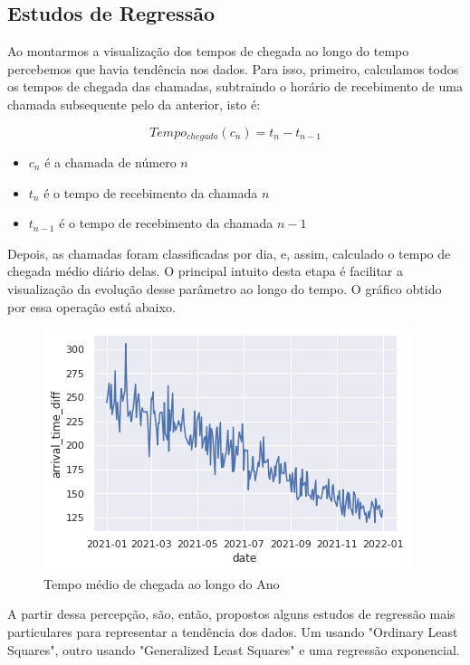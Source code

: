 \subsection{Estudos de Regressão}

Ao montarmos a visualização dos tempos de chegada ao longo do tempo percebemos que havia tendência nos dados. Para isso, primeiro, calculamos todos os tempos de chegada das chamadas, subtraindo o horário de recebimento de uma chamada subsequente pelo da anterior, isto é:

$$Tempo_{chegada}(c_n) = t_n - t_{n-1}$$ 

\begin{itemize}
    \item $c_n$ é a chamada de número $n$
    \item $t_n$ é o tempo de recebimento da chamada $n$
    \item $t_{n-1}$ é o tempo de recebimento da chamada $n-1$
\end{itemize}

Depois, as chamadas foram classificadas por dia, e, assim, calculado o tempo de chegada médio diário delas. O principal intuito desta etapa é facilitar a visualização da evolução desse parâmetro ao longo do tempo. O gráfico obtido por essa operação está abaixo.

\begin{figure}[H]
    \includegraphics{analise-de-dados/regressao/tempo_chegada_medio.png}
    \caption{Tempo médio de chegada ao longo do Ano}
    \label{fig: tempos_de_chegada}
\end{figure}

A partir dessa percepção, são, então, propostos alguns estudos de regressão mais particulares para representar a tendência dos dados. Um usando "Ordinary Least Squares", outro usando "Generalized Least Squares" e uma regressão exponencial.  